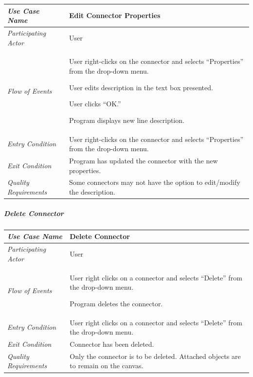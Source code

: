 \documentclass[twoside,letterpaper]{article}
\newenvironment{my_enumerate}{
\begin{enumerate}
  \setlength{\itemsep}{1pt}
  \setlength{\parskip}{0pt}
  \setlength{\parsep}{0pt}}{\end{enumerate}
}
\begin{document}
\begin{flushleft}
\tablehead{}
\begin{tabular}{|m{2.0in} m{5.0in}|}
\hline {\bfseries\emph{Use Case Name}}
& {\bfseries Edit Connector Properties}
\\\hline
\emph{Participating Actor}
& User
\\\hline
\emph{Flow of Events}
& 
\begin{my_enumerate}
\item User right-clicks on the connector and selects ``Properties'' from the drop-down menu.
\item User edits description in the text box presented.
\item User clicks ``OK.''
\item Program displays new line description.
\end{my_enumerate}
\\\hline
\emph{Entry Condition}
& User right-clicks on the connector and selects ``Properties'' from the drop-down menu.
\\\hline
\emph{Exit Condition}
& Program has updated the connector with the new properties.
\\\hline
\emph{Quality Requirements}
& Some connectors may not have the option to edit/modify the description.
\\\hline
\end{tabular}
\end{flushleft}
\bigskip



\subparagraph[\ Delete Connector ] 
{\bfseries Delete Connector }

\begin{flushleft}
\tablehead{}
\begin{tabular}{|m{2.0in} m{5.0in}|}
\hline {\bfseries\emph{Use Case Name}}
& {\bfseries Delete Connector}
\\\hline
\emph{Participating Actor}
& User
\\\hline
\emph{Flow of Events}
& \begin{my_enumerate}
\item User right clicks on a connector and selects ``Delete'' from the drop-down menu.
\item Program deletes the connector.
\end{my_enumerate}
\\\hline
\emph{Entry Condition}
& User right clicks on a connector and selects ``Delete'' from the drop-down menu.
\\\hline
\emph{Exit Condition}
& Connector has been deleted.
\\\hline
\emph{Quality Requirements}
& Only the connector is to be deleted. Attached objects are to remain on the canvas.
\\\hline
\end{tabular}
\end{flushleft}
\bigskip
\end{document}
